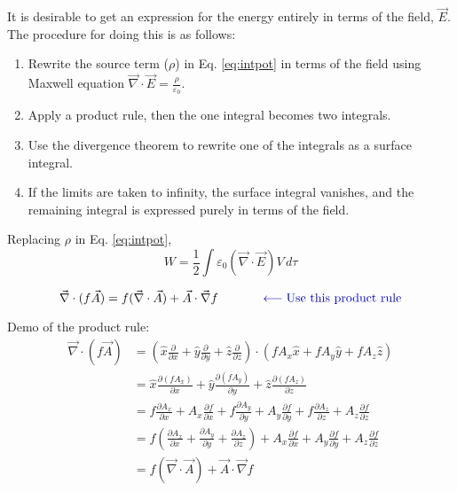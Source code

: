 \documentclass[12pt]{article}
\begin{document}
\begin{flushleft}
It is desirable to get an expression for the energy entirely in terms of the field, $\vec{E}$.  The procedure for doing this is as follows:
\begin{enumerate}
\item Rewrite the source term ($\rho$) in Eq. \ref{eq:intpot} in terms of the field using Maxwell equation $\vec{\nabla} \cdot \vec{E} = \frac{\rho}{\varepsilon_{0}}$.
\item Apply a product rule, then the one integral becomes two integrals.
\item Use the divergence theorem to rewrite one of the integrals as a surface integral.
\item If the limits are taken to infinity, the surface integral vanishes, and the remaining integral is expressed purely in terms of the field. 
\end{enumerate}

Replacing $\rho$ in Eq. \ref{eq:intpot},
\begin{equation}
 W = \frac{1}{2}   \int \varepsilon_{0} (\vec{\nabla} \cdot \vec{E}) V \, d\tau
 \label{eq:intfield}
 \end{equation} 
 
\begin{equation*}
\vec{\nabla} \cdot (f\vec{A})  =  f(\vec{\nabla} \cdot \vec{A}) + \vec{A} \cdot \vec{\nabla}f  \hspace{.5in} {\color{myblue} \longleftarrow \mbox{Use this product rule}} 
\end{equation*}

Demo of the product rule:\\

\begin{equation*}
\begin{aligned}
 \vec{\nabla} \cdot (f\vec{A})  & = \left( \hat{x}\frac{\partial }{\partial x} + \hat{y}\frac{\partial }{\partial y} + \hat{z}\frac{\partial }{\partial z}\right)  \cdot \left( fA_{x}\hat{x} + fA_{y}\hat{y} + fA_{z}\hat{z} \right) \\
& = \hat{x}\frac{\partial (fA_{x})}{\partial x} + \hat{y}\frac{\partial (fA_{y})}{\partial y} + \hat{z}\frac{\partial (fA_{z})}{\partial z} \\
& = f\frac{\partial A_{x}}{\partial x} + A_{x}\frac{\partial f}{\partial x} + f\frac{\partial A_{y}}{\partial y} + A_{y}\frac{\partial f}{\partial y} + f\frac{\partial A_{z}}{\partial z} + A_{z}\frac{\partial f}{\partial z} \\
& = f\left( \frac{\partial A_{x}}{\partial x} + \frac{\partial A_{y}}{\partial y} +\frac{\partial A_{z}}{\partial z} \right) 
+ A_{x}\frac{\partial f}{\partial x} + A_{y}\frac{\partial f}{\partial y} + A_{z}\frac{\partial f}{\partial z} \\
& = f(\vec{\nabla} \cdot \vec{A}) + \vec{A} \cdot \vec{\nabla}f 
\end{aligned}
\end{equation*}



\end{flushleft}
\end{document}
